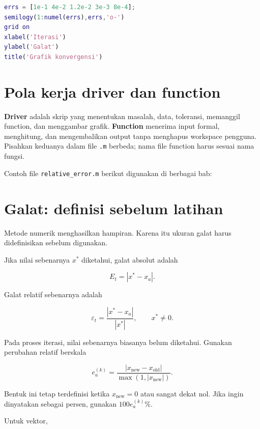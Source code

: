 \begin{lstlisting}[language=Matlab]
errs = [1e-1 4e-2 1.2e-2 3e-3 8e-4];
semilogy(1:numel(errs),errs,'o-')
grid on
xlabel('Iterasi')
ylabel('Galat')
title('Grafik konvergensi')
\end{lstlisting}

\section{Pola kerja driver dan function}
\textbf{Driver} adalah skrip yang menentukan masalah, data, toleransi, memanggil function, dan menggambar grafik. \textbf{Function} menerima input formal, menghitung, dan mengembalikan output tanpa menghapus workspace pengguna. Pisahkan keduanya dalam file \texttt{.m} berbeda; nama file function harus sesuai nama fungsi.

Contoh file \texttt{relative\_error.m} berikut digunakan di berbagai bab:


\section{Galat: definisi sebelum latihan}

Metode numerik menghasilkan hampiran. Karena itu ukuran galat harus didefinisikan sebelum digunakan.

Jika nilai sebenarnya $x^\ast$ diketahui, galat absolut adalah

\begin{equation}
E_t = |x^\ast-x_a|.
\end{equation}

Galat relatif sebenarnya adalah

\begin{equation}
\varepsilon_t =
\frac{|x^\ast-x_a|}{|x^\ast|},
\qquad x^\ast\neq0.
\end{equation}

Pada proses iterasi, nilai sebenarnya biasanya belum diketahui.
Gunakan perubahan relatif berskala

\begin{equation}
e_a^{(k)}
=
\frac{|x_{\mathrm{new}}-x_{\mathrm{old}}|}
{\max\left(1,|x_{\mathrm{new}}|\right)}.
\end{equation}

Bentuk ini tetap terdefinisi ketika $x_{\mathrm{new}}=0$ atau sangat dekat nol.
Jika ingin dinyatakan sebagai persen, gunakan $100e_a^{(k)}\%$.

Untuk vektor,

